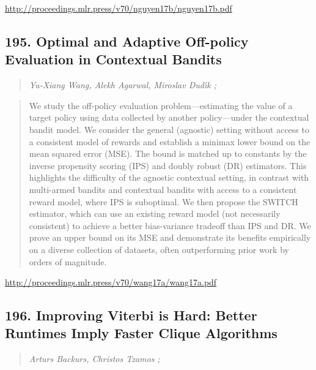 \documentclass{article}
\begin{document}
\href{http://proceedings.mlr.press/v70/nguyen17b/nguyen17b.pdf}{http://proceedings.mlr.press/v70/nguyen17b/nguyen17b.pdf}

\subsection{195. Optimal and Adaptive Off-policy Evaluation in Contextual Bandits}

\begin{quote}
\footnotesize{\textit{Yu-Xiang Wang, Alekh Agarwal, Miroslav Dudı́k ;}}
\end{quote}

\begin{quote}
    We study the off-policy evaluation problem—estimating the value of a target policy using data collected by another policy—under the contextual bandit model. We consider the general (agnostic) setting without access to a consistent model of rewards and establish a minimax lower bound on the mean squared error (MSE). The bound is matched up to constants by the inverse propensity scoring (IPS) and doubly robust (DR) estimators. This highlights the difficulty of the agnostic contextual setting, in contrast with multi-armed bandits and contextual bandits with access to a consistent reward model, where IPS is suboptimal. We then propose the SWITCH estimator, which can use an existing reward model (not necessarily consistent) to achieve a better bias-variance tradeoff than IPS and DR. We prove an upper bound on its MSE and demonstrate its benefits empirically on a diverse collection of datasets, often outperforming prior work by orders of magnitude.  \end{quote}

\href{http://proceedings.mlr.press/v70/wang17a/wang17a.pdf}{http://proceedings.mlr.press/v70/wang17a/wang17a.pdf}

\subsection{196. Improving Viterbi is Hard: Better Runtimes Imply Faster Clique Algorithms}

\begin{quote}
\footnotesize{\textit{Arturs Backurs, Christos Tzamos ;}}
\end{quote}
\end{document}
